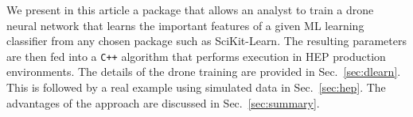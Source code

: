 We present in this article a package that allows an analyst to 
train a drone neural network that learns the important features of a 
given ML learning classifier from any chosen package such as SciKit-Learn.
The resulting parameters are then fed into a {\tt C++} algorithm that
performs execution in HEP production environments. The details of the
drone training are provided in Sec.~\ref{sec:dlearn}. This is followed
by a real example using simulated data in Sec.~\ref{sec:hep}. The advantages
of the approach are discussed in Sec.~\ref{sec:summary}.
